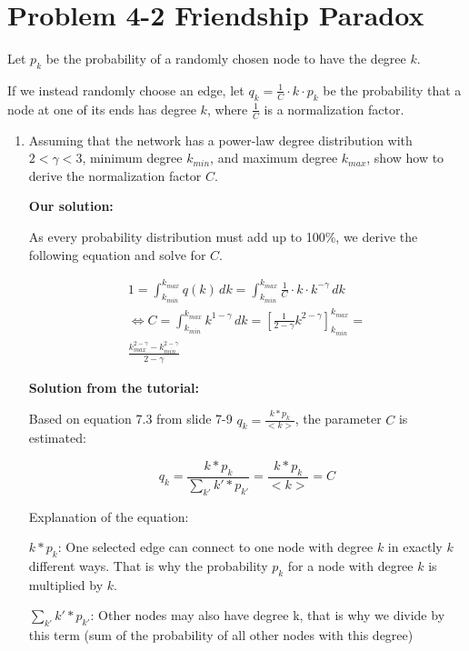 \section{Problem 4-2 Friendship Paradox}

Let $p_k$ be the probability of a randomly chosen node to have the degree $k$.

If we instead randomly choose an edge, let $q_k = \frac{1}{C} \cdot k \cdot p_k$ be the probability that a node at one of its ends has degree $k$, where $\frac{1}{C}$ is a normalization factor.

\begin{enumerate}
	\item Assuming that the network has a power-law degree distribution with $2 < \gamma
< 3$, minimum degree $k_{min}$, and maximum degree $k_{max}$, show how to derive the normalization factor $C$.

	\textbf{Our solution:}
	
	As every probability distribution must add up to 100\%, we derive the following equation and solve for $C$.

	\begin{equation}
		\begin{split}
		1 = \int_{k_{min}}^{k_{max}} q(k) \, dk = \int_{k_{min}}^{k_{max}} \frac{1}{C} \cdot k \cdot k^{-\gamma} \, dk \\
		\Leftrightarrow C = \int_{k_{min}}^{k_{max}} k^{1-\gamma} \, dk = [\frac{1}{2-\gamma} k^{2-\gamma}]_{k_{min}}^{k_{max}} = \\
		\frac{k_{max}^{2-\gamma} - k_{min}^{2-\gamma}}{2-\gamma}
		\end{split}
	\end{equation}
	
	\textbf{Solution from the tutorial:}
	
	Based on equation 7.3 from slide 7-9 $q_k = \frac{k * p_k}{<k>} $, the parameter $C$ is estimated:
	
	\begin{equation}
	q_k = \frac{k * p_k}{\sum_{k'}^{} k' * p_{k'}} = \frac{k * p_k}{<k>} = C
	\end{equation}
	
	Explanation of the equation:
	
	$k * p_k$: One selected edge can connect to one node with degree $k$ in exactly $k$ different ways. That is why the probability $p_k$ for a node with degree $k$ is multiplied by $k$.
	
	$\sum_{k'}^{} k' * p_{k'}$: Other nodes may also have degree k, that is why we divide by this term (sum of the probability of all other nodes with this degree)
	

\end{enumerate}
